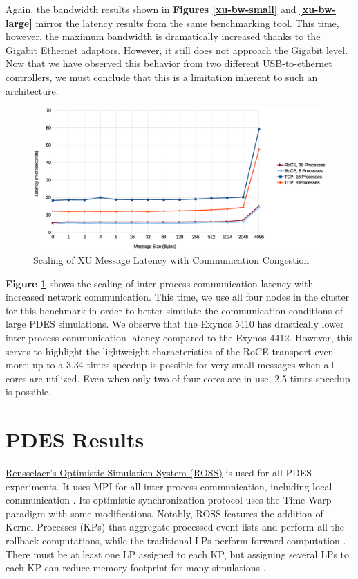 \documentclass[11pt]{book}
\begin{document}
Again, the bandwidth results shown in \textbf{Figures \ref{xu-bw-small}} and
\textbf{\ref{xu-bw-large}} mirror the latency results from the same benchmarking
tool. This time, however, the maximum bandwidth is dramatically increased thanks
to the Gigabit Ethernet adaptors. However, it still does not approach the
Gigabit level. Now that we have observed this behavior from two different
USB-to-ethernet controllers, we must conclude that this is a limitation inherent
to such an architecture.

\begin{figure}[h]
\includegraphics[width=\textwidth]{xu_imb}
\caption{Scaling of XU Message Latency with Communication Congestion}
\label{xu-imb-low}
\end{figure}

\textbf{Figure \ref{xu-imb-low}} shows the scaling of inter-process
communication latency with increased network communication. This time, we use
all four nodes in the cluster for this benchmark in order to better simulate the
communication conditions of large PDES simulations. We observe that the Exynos
5410 has drastically lower inter-process communication latency compared to the
Exynos 4412. However, this serves to highlight the lightweight characteristics
of the RoCE transport even more; up to a 3.34 times speedup is possible for very
small messages when all cores are utilized. Even when only two of four cores are
in use, 2.5 times speedup is possible.

\section{\textbf{PDES Results}}

\href{https://github.com/carothersc/ROSS}{Rensselaer's Optimistic Simulation
  System (ROSS)} is used for all PDES experiments. It uses MPI for all
inter-process communication, including local communication
\cite{carothers-02}. Its optimistic synchronization protocol uses the Time Warp
paradigm with some modifications. Notably, ROSS features the addition of Kernel
Processes (KPs) that aggregate processed event lists and perform all the
rollback computations, while the traditional LPs perform forward computation
\cite{carothers-02}. There must be at least one LP assigned to each KP, but
assigning several LPs to each KP can reduce memory footprint for many
simulations \cite{carothers-02}.
\end{document}
